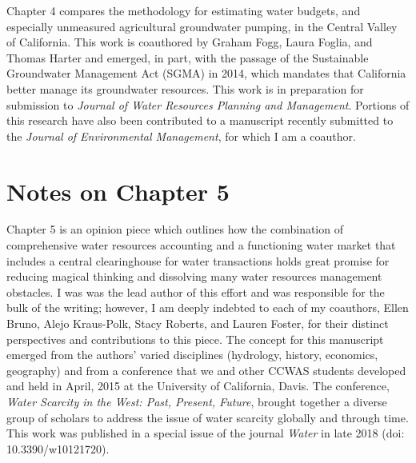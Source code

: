 Chapter 4 compares the methodology for estimating water budgets, and especially unmeasured agricultural groundwater pumping, in the Central Valley of California. This work is coauthored by Graham Fogg, Laura Foglia, and Thomas Harter and emerged, in part, with the passage of the Sustainable Groundwater Management Act (SGMA) in 2014, which mandates that California better manage its groundwater resources. This work is in preparation for submission to \textit{Journal of Water Resources Planning and Management}. Portions of this research have also been contributed to a manuscript recently submitted to the \textit{Journal of Environmental Management}, for which I am a coauthor.

\section*{Notes on Chapter 5} 

Chapter 5 is an opinion piece which outlines how the combination of comprehensive water resources accounting and a functioning water market that includes a central clearinghouse for water transactions holds great promise for reducing magical thinking and dissolving many water resources management obstacles. I was was the lead author of this effort and was responsible for the bulk of the writing; however, I am deeply indebted to each of my coauthors, Ellen Bruno, Alejo Kraus-Polk, Stacy Roberts, and Lauren Foster, for their distinct perspectives and contributions to this piece. The concept for this manuscript emerged from the authors’ varied disciplines (hydrology, history, economics, geography) and from a conference that we and other CCWAS students developed and held in April, 2015 at the University of California, Davis. The conference, \textit{Water Scarcity in the West: Past, Present, Future}, brought together a diverse group of scholars to address the issue of water scarcity globally and through time. This work was published in a special issue of the journal \textit{Water} in late 2018 (doi: 10.3390/w10121720).